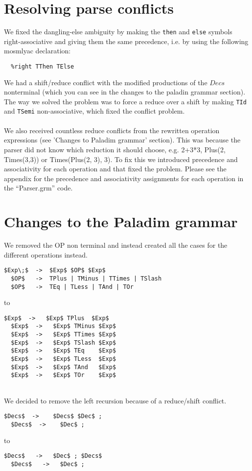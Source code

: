 \documentclass[12pt,a4paper]{article}
\begin{document}
\section{Resolving parse conflicts}
We fixed the dangling-else ambiguity by making the \texttt{then} and
\texttt{else} symbols right-associative and giving them the same precedence,
i.e. by using the following mosmlyac declaration:

\begin{verbatim}
  %right TThen TElse 
\end{verbatim}

\noindent
We had a shift/reduce conflict with the modified productions of the $Decs$
nonterminal (which you can see in the changes to the paladin grammar section).
The way we solved the problem was to force a reduce over a shift by making
\texttt{TId} and \texttt{TSemi} non-associative, which fixed the conflict
problem. \\
\\
We also received countless reduce conflicts from the rewritten operation
expressions (see 'Changes to \textsf{Paladim} grammar' section).  This was
because the parser did not know which reduction it should choose, e.g. 2+3*3,
Plus(2, Times(3,3)) or Times(Plus(2, 3), 3). To fix this we introduced
precedence and associativity for each operation and that fixed the problem.
Please see the appendix for the precedence and associativity assignments for
each operation in the ``Parser.grm'' code.

\section{Changes to the \textsf{Paladim} grammar}
We removed the OP non terminal and instead created all the cases for the
different operations instead.
\begin{lstlisting}[style=GrammarStyle]
  $Exp\;$  ->  $Exp$ $OP$ $Exp$ 
  $OP$   ->  TPlus | TMinus | TTimes | TSlash 
  $OP$   ->  TEq | TLess | TAnd | TOr
\end{lstlisting}
to
\begin{lstlisting}[style=GrammarStyle]
  $Exp$  ->   $Exp$ TPlus  $Exp$
  $Exp$  ->   $Exp$ TMinus $Exp$
  $Exp$  ->   $Exp$ TTimes $Exp$
  $Exp$  ->   $Exp$ TSlash $Exp$
  $Exp$  ->   $Exp$ TEq    $Exp$
  $Exp$  ->   $Exp$ TLess  $Exp$
  $Exp$  ->   $Exp$ TAnd   $Exp$
  $Exp$  ->   $Exp$ TOr    $Exp$ 
\end{lstlisting}
\hfill\\
We decided to remove the left recursion because of a reduce/shift conflict.
\begin{lstlisting}[style=GrammarStyle]
  $Decs$  ->    $Decs$ $Dec$ ; 
  $Decs$  ->    $Dec$ ;
\end{lstlisting}
to
\begin{lstlisting}[style=GrammarStyle]
  $Decs$   ->   $Dec$ ; $Decs$
  $Decs$   ->   $Dec$ ;
\end{lstlisting}
\end{document}

